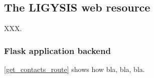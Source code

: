 




\subsection{The LIGYSIS web resource}

XXX.

\subsubsection{Flask application backend}

\autoref{get_contacts_route} shows how bla, bla, bla.

\lstset{style=mystyle}

